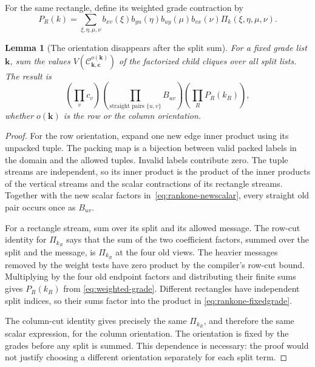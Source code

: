 \documentclass[11pt]{article}
\newtheorem{lemma}[theorem]{Lemma}
\theoremstyle{definition}
\theoremstyle{remark}
\begin{document}
For the same rectangle, define its weighted grade contraction by
\[
 P_R(k)=\sum_{\xi,\eta,\mu,\nu}
 b_{xv}(\xi)b_{yu}(\eta)b_{uy}(\mu)b_{vx}(\nu)
 \Pi_k(\xi,\eta,\mu,\nu).
 \tag{\thesection.9}\label{eq:weighted-grade}
\]

\begin{lemma}[The orientation disappears after the split sum]
\label{lem:rankone-fixedgrade}
For a fixed grade list $\mathbf k$, sum the values
$V(\mathcal C^{o(\mathbf k)}_{\mathbf k,\mathbf c})$ of the
factorized child cliques over all split lists. The result is
\[
 \left(\prod_vc_v\right)
 \left(\prod_{\text{straight pairs }\{u,v\}}B_{uv}\right)
 \left(\prod_R P_R(k_R)\right),
 \tag{\thesection.10}\label{eq:rankone-fixedgrade}
\]
whether $o(\mathbf k)$ is the row or the column orientation.
\end{lemma}
\begin{proof}
For the row orientation, expand one new edge inner product using its
unpacked tuple. The packing map is a bijection between valid packed
labels in the domain and the allowed tuples. Invalid labels contribute
zero. The tuple streams are independent, so its inner product is the
product of the inner products of the vertical streams and the scalar
contractions of its rectangle streams. Together with the new scalar
factors in~\eqref{eq:rankone-newscalar}, every straight old pair occurs
once as $B_{uv}$.

For a rectangle stream, sum over its split and its allowed message.
The row-cut identity for $\Pi_{k_R}$ says that the sum of the two
coefficient factors, summed over the split and the message, is
$\Pi_{k_R}$ at the four old views. The heavier
messages removed by the weight tests have zero product by the
compiler's row-cut bound. Multiplying by the four old endpoint factors
and distributing their finite sums gives $P_R(k_R)$ from
\eqref{eq:weighted-grade}. Different rectangles have independent split
indices, so their sums factor into the product in
\eqref{eq:rankone-fixedgrade}.

The column-cut identity gives precisely the same $\Pi_{k_R}$, and
therefore the same scalar expression, for the column orientation.
The orientation is fixed by the grades before any split is summed.
This dependence is necessary: the proof would not justify choosing a
different orientation separately for each split term.
\end{proof}
\end{document}
